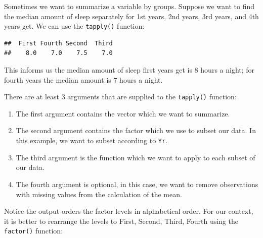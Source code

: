 \documentclass[
]{book}
\newenvironment{Shaded}{\begin{snugshade}}{\end{snugshade}}
\newcommand{\AttributeTok}[1]{\textcolor[rgb]{0.13,0.29,0.53}{#1}}
\newcommand{\FunctionTok}[1]{\textcolor[rgb]{0.13,0.29,0.53}{\textbf{#1}}}
\newcommand{\NormalTok}[1]{#1}
\newcommand{\OtherTok}[1]{\textcolor[rgb]{0.56,0.35,0.01}{#1}}
\newcommand{\SpecialCharTok}[1]{\textcolor[rgb]{0.81,0.36,0.00}{\textbf{#1}}}
\newcommand{\StringTok}[1]{\textcolor[rgb]{0.31,0.60,0.02}{#1}}
\begin{document}
Sometimes we want to summarize a variable by groups. Suppose we want to find the median amount of sleep separately for 1st years, 2nd years, 3rd years, and 4th years get. We can use the \texttt{tapply()} function:

\begin{Shaded}
\end{Shaded}

\begin{verbatim}
##  First Fourth Second  Third 
##    8.0    7.0    7.5    7.0
\end{verbatim}

This informs us the median amount of sleep first years get is 8 hours a night; for fourth years the median amount is 7 hours a night.

There are at least 3 arguments that are supplied to the \texttt{tapply()} function:

\begin{enumerate}
\def\labelenumi{\arabic{enumi}.}
\item
  The first argument contains the vector which we want to summarize.
\item
  The second argument contains the factor which we use to subset our data. In this example, we want to subset according to \texttt{Yr}.
\item
  The third argument is the function which we want to apply to each subset of our data.
\item
  The fourth argument is optional, in this case, we want to remove observations with missing values from the calculation of the mean.
\end{enumerate}

Notice the output orders the factor levels in alphabetical order. For our context, it is better to rearrange the levels to First, Second, Third, Fourth using the \texttt{factor()} function:

\begin{Shaded}
\end{Shaded}
\end{document}
